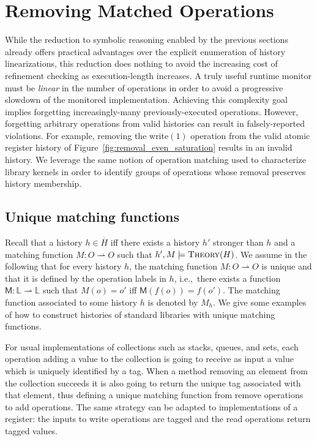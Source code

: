 \section{Removing Matched Operations}
\label{sec:obsolete}

While the reduction to symbolic reasoning enabled by the previous sections
already offers practical advantages over the explicit enumeration of history
linearizations, this reduction does nothing to avoid the increasing cost of
refinement checking as execution-length increases. A truly useful runtime
monitor must be \emph{linear} in the number of operations in order to avoid a
progressive slowdown of the monitored implementation. Achieving this complexity
goal implies forgetting increasingly-many previously-executed operations.
However, forgetting arbitrary operations from valid histories can result in
falsely-reported violations. For example, removing the write$(1)$
operation from the valid atomic register history of
Figure~\ref{fig:removal_even_saturation} results in an invalid history. We
leverage the same notion of operation matching used to characterize library
kernels in order to identify groups of operations whose removal preserves
history membership.

\subsection{Unique matching functions}

Recall that a history $h\in \overline{H}$ iff there exists a history $h'$
stronger than $h$ and a matching function $M : O \rightharpoonup O$ such that
$h',M\models \textsc{Theory}(H)$. We assume in the following that for every
history $h$, the matching function $M : O \rightharpoonup O$ is unique and that
it is defined by the operation labels in $h$, i.e.,~there exists a function
$\mathsf{M}:\mathbb{L} \rightharpoonup \mathbb{L}$ such that $M(o)=o'$ iff
$\mathsf{M}(f(o))=f(o')$. The matching function associated to some history $h$
is denoted by $M_h$. We give some examples of how to construct histories of
standard libraries with unique matching functions.

\begin{example}[Collections]

  For usual implementations of collections such as stacks, queues, and sets,
  each operation adding a value to the collection is going to receive as input
  a value which is uniquely identified by a tag. When a method removing an
  element from the collection succeeds it is also going to return the unique
  tag associated with that element, thus defining a unique matching function
  from remove operations to add operations. The same strategy can be adapted to
  implementations of a register: the inputs to write operations are tagged and
  the read operations return tagged values.

\end{example}

